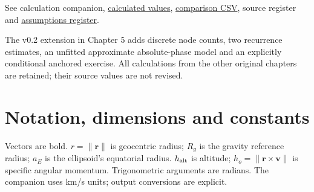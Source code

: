 \documentclass[10pt,a4paper]{article}
\numberwithin{equation}{section}
\begin{document}
\begin{sloppypar}See \textcolor{atlasbluelight}{calculation companion}, \href{../evidence/calculations.json}{calculated values}, \href{../evidence/ANALYTICAL_COMPARISON.csv}{comparison CSV}, \textcolor{atlasbluelight}{source register} and \href{../evidence/ASSUMPTIONS_AND_LIMITATIONS.md}{assumptions register}.\end{sloppypar}


\begin{sloppypar}The v0.2 extension in Chapter 5 adds discrete node counts, two recurrence estimates, an unfitted approximate absolute-phase model and an explicitly conditional anchored exercise. All calculations from the other original chapters are retained; their source values are not revised.\end{sloppypar}


\section*{Notation, dimensions and constants}

\begin{sloppypar}Vectors are bold. \(r=\|\mathbf r\|\) is geocentric radius; \(R_g\) is the gravity reference radius; \(a_E\) is the ellipsoid's equatorial radius. \(h_{\rm alt}\) is altitude; \(h_o=\|\mathbf r\times\mathbf v\|\) is specific angular momentum. Trigonometric arguments are radians. The companion uses km/s units; output conversions are explicit.\end{sloppypar}
\end{document}

